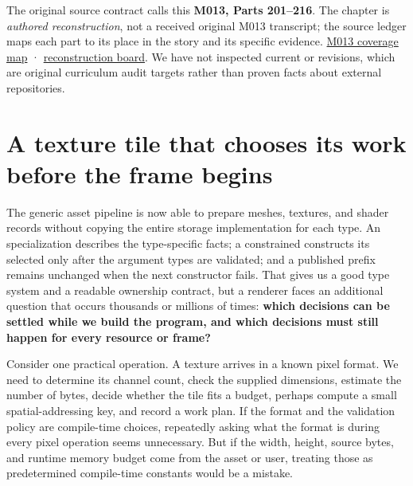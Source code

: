 The original source contract calls this \textbf{M013, Parts 201--216}. The chapter is \emph{authored reconstruction}, not a received original M013 transcript; the source ledger maps each part to its place in the story and its specific evidence. \hyperref[appendix-fd090d982a15-m013-parts-201216-generic-asset-preparation-with-constrained-apis]{M013 coverage map} · \hyperref[appendix-960160274237-one-asset-pipeline-many-types-m013-retrieval]{reconstruction board}. We have not inspected current  or  revisions, which are original curriculum audit targets rather than proven facts about external repositories.

\section{A texture tile that chooses its work before the frame begins}\label{01-foundations-i-ch005-a-texture-tile-that-chooses-its-work-before-the-frame-begins}

\hypertarget{01-foundations-i-ch005-a-texture-tile-that-chooses-its-work-before-the-frame-begins}{}

The generic asset pipeline is now able to prepare meshes, textures, and shader records without copying the entire storage implementation for each type. An  specialization describes the type-specific facts; a constrained  constructs its selected  only after the argument types are validated; and a published prefix remains unchanged when the next constructor fails. That gives us a good type system and a readable ownership contract, but a renderer faces an additional question that occurs thousands or millions of times: \textbf{which decisions can be settled while we build the program, and which decisions must still happen for every resource or frame?}

Consider one practical operation. A texture arrives in a known pixel format. We need to determine its channel count, check the supplied dimensions, estimate the number of bytes, decide whether the tile fits a budget, perhaps compute a small spatial-addressing key, and record a work plan. If the format and the validation policy are compile-time choices, repeatedly asking what the format is during every pixel operation seems unnecessary. But if the width, height, source bytes, and runtime memory budget come from the asset or user, treating those as predetermined compile-time constants would be a mistake.

